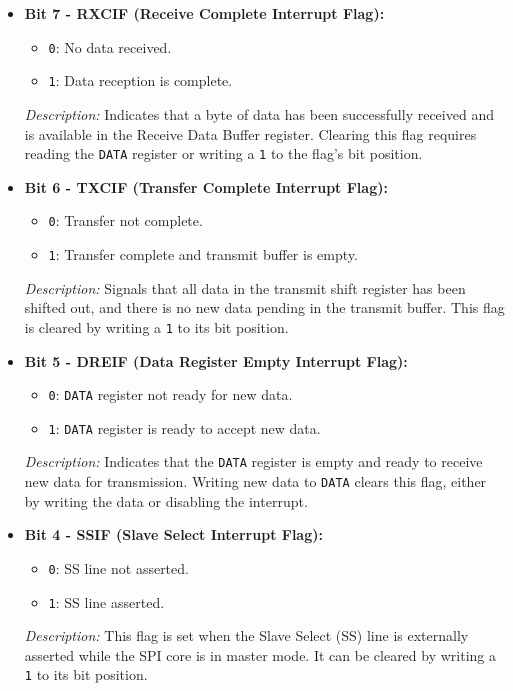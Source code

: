 \documentclass{article}
\begin{document}
\begin{itemize}
    \item \textbf{Bit 7 - RXCIF (Receive Complete Interrupt Flag):} 
    \begin{itemize}
        \item \texttt{0}: No data received.
        \item \texttt{1}: Data reception is complete.
    \end{itemize}
    \textit{Description:} Indicates that a byte of data has been successfully received and is available in the Receive Data Buffer register. Clearing this flag requires reading the \texttt{DATA} register or writing a \texttt{1} to the flag's bit position.
    
    \item \textbf{Bit 6 - TXCIF (Transfer Complete Interrupt Flag):} 
    \begin{itemize}
        \item \texttt{0}: Transfer not complete.
        \item \texttt{1}: Transfer complete and transmit buffer is empty.
    \end{itemize}
    \textit{Description:} Signals that all data in the transmit shift register has been shifted out, and there is no new data pending in the transmit buffer. This flag is cleared by writing a \texttt{1} to its bit position.
    
    \item \textbf{Bit 5 - DREIF (Data Register Empty Interrupt Flag):} 
    \begin{itemize}
        \item \texttt{0}: \texttt{DATA} register not ready for new data.
        \item \texttt{1}: \texttt{DATA} register is ready to accept new data.
    \end{itemize}
    \textit{Description:} Indicates that the \texttt{DATA} register is empty and ready to receive new data for transmission. Writing new data to \texttt{DATA} clears this flag, either by writing the data or disabling the interrupt.
    
    \item \textbf{Bit 4 - SSIF (Slave Select Interrupt Flag):} 
    \begin{itemize}
        \item \texttt{0}: SS line not asserted.
        \item \texttt{1}: SS line asserted.
    \end{itemize}
    \textit{Description:} This flag is set when the Slave Select (SS) line is externally asserted while the SPI core is in master mode. It can be cleared by writing a \texttt{1} to its bit position.
    

\end{itemize}
\end{document}
